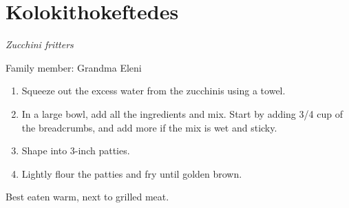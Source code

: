 \chapter{Kolokithokeftedes}
\label{ch:kolokithokeftedes}



\textit{Zucchini fritters}

Family member: Grandma Eleni

\begin{enumerate}
    \item Squeeze out the excess water from the zucchinis using a towel.
    \item In a large bowl, add all the ingredients and mix. Start by adding 3/4 cup of the breadcrumbs, and add more if the mix is wet and sticky.
    \item Shape into 3-inch patties.
    \item Lightly flour the patties and fry until golden brown.
\end{enumerate}

Best eaten warm, next to grilled meat.
